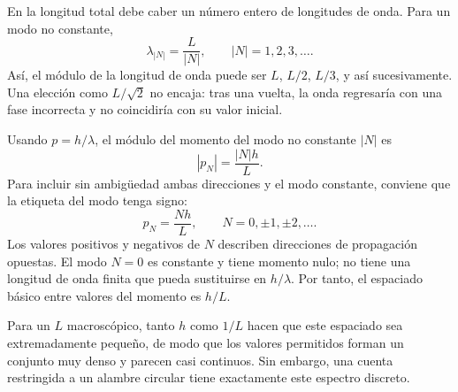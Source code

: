 En la longitud total debe caber un número entero de longitudes de onda. Para un modo no constante,
\begin{equation}
\lambda_{|N|}=\frac{L}{|N|},
\qquad |N|=1,2,3,\ldots .
\end{equation}
Así, el módulo de la longitud de onda puede ser \(L\), \(L/2\), \(L/3\), y así sucesivamente. Una elección como \(L/\sqrt{2}\) no encaja: tras una vuelta, la onda regresaría con una fase incorrecta y no coincidiría con su valor inicial.

Usando \(p=h/\lambda\), el módulo del momento del modo no constante \(|N|\) es
\begin{equation}
|p_N|=\frac{|N|h}{L}.
\end{equation}
Para incluir sin ambigüedad ambas direcciones y el modo constante, conviene que la etiqueta del modo tenga signo:
\begin{equation}
p_N=\frac{Nh}{L},
\qquad N=0,\pm1,\pm2,\ldots .
\end{equation}
Los valores positivos y negativos de \(N\) describen direcciones de propagación opuestas. El modo \(N=0\) es constante y tiene momento nulo; no tiene una longitud de onda finita que pueda sustituirse en \(h/\lambda\). Por tanto, el espaciado básico entre valores del momento es \(h/L\).

Para un \(L\) macroscópico, tanto \(h\) como \(1/L\) hacen que este espaciado sea extremadamente pequeño, de modo que los valores permitidos forman un conjunto muy denso y parecen casi continuos. Sin embargo, una cuenta restringida a un alambre circular tiene exactamente este espectro discreto.

\begin{classroomqa}
\end{classroomqa}

\begin{classroomqa}
\end{classroomqa}

